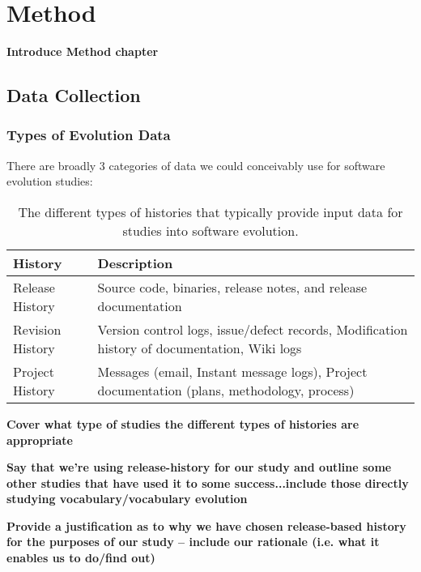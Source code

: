\chapter{Method}
\label{chapter:Method}

\textbf{Introduce Method chapter}

\section{Data Collection} %
\label{sec:data_collection}

\subsection{Types of Evolution Data} %
\label{sub:types_of_evolution_data}

There are broadly 3 categories of data we could conceivably use for software evolution studies:

\begin{table*}[t]
\centering
\begin{tabular}{|p{}|p{}|}
\hline
{\bf History} & {\bf Description}\\
\hline \hline
Release History & Source code, binaries, release notes, and release documentation\\
\hline
Revision History & Version control logs, issue/defect records, Modification history of documentation, Wiki logs\\
\hline
Project History & Messages (email, Instant message logs), Project documentation (plans, methodology, process)\\
\hline
\end{tabular}
\vspace{0.2cm}
\caption{The different types of histories that typically provide input data for studies into software evolution.}
\label{tab:Histories}
\vspace{-0.2cm}
\end{table*}

\textbf{Cover what type of studies the different types of histories are appropriate}

\textbf{Say that we're using release-history for our study and outline some other studies that have used it to some success...include those directly studying vocabulary/vocabulary evolution}

\textbf{Provide a justification as to why we have chosen release-based history for the purposes of our study -- include our rationale (i.e. what it enables us to do/find out)}

